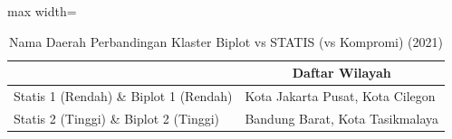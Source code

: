 \begin{table}[H]
\centering
\caption{Nama Daerah Perbandingan Klaster Biplot vs STATIS (vs Kompromi) (2021)} \label{tab:sample1biplot_statis_name_2021}
\begin{adjustbox}{max width=\textwidth}
\begin{tabular}{|>{\centering\arraybackslash}p{4cm}|p{10cm}|}
\hline
\multicolumn{1}{|c|}{\textbf{Kategori}} & \multicolumn{1}{c|}{\textbf{Daftar Wilayah}} \\
\hline
Statis 1 (Rendah) \& Biplot 1 (Rendah) & Kota Jakarta Pusat, Kota Cilegon \\
\hline
Statis 2 (Tinggi) \& Biplot 2 (Tinggi) & Bandung Barat, Kota Tasikmalaya \\
\hline
\end{tabular}
\end{adjustbox}
\end{table}
